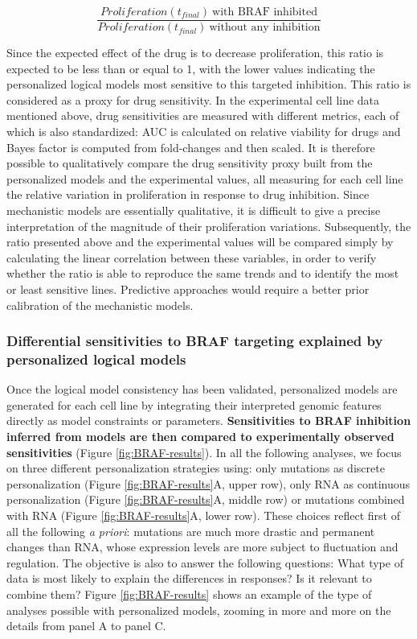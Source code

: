 \documentclass[a4paper,12pt,twoside,onecolumn,openright,final,oldfontcommands]{memoir}
\begin{document}
\[\dfrac{Proliferation(t_{final})~\text{with BRAF inhibited}}{Proliferation(t_{final})~\text{without any inhibition}}\]

Since the expected effect of the drug is to decrease proliferation, this
ratio is expected to be less than or equal to 1, with the lower values
indicating the personalized logical models most sensitive to this
targeted inhibition. This ratio is considered as a proxy for drug
sensitivity. In the experimental cell line data mentioned above, drug
sensitivities are measured with different metrics, each of which is also
standardized: AUC is calculated on relative viability for drugs and
Bayes factor is computed from fold-changes and then scaled. It is
therefore possible to qualitatively compare the drug sensitivity proxy
built from the personalized models and the experimental values, all
measuring for each cell line the relative variation in proliferation in
response to drug inhibition. Since mechanistic models are essentially
qualitative, it is difficult to give a precise interpretation of the
magnitude of their proliferation variations. Subsequently, the ratio
presented above and the experimental values will be compared simply by
calculating the linear correlation between these variables, in order to
verify whether the ratio is able to reproduce the same trends and to
identify the most or least sensitive lines. Predictive approaches would
require a better prior calibration of the mechanistic models.

\subsubsection{Differential sensitivities to BRAF targeting explained by
personalized logical models}\label{diff-BRAF}

Once the logical model consistency has been validated, personalized
models are generated for each cell line by integrating their interpreted
genomic features directly as model constraints or parameters.
\textbf{Sensitivities to BRAF inhibition inferred from models are then
compared to experimentally observed sensitivities} (Figure
\ref{fig:BRAF-results}). In all the following analyses, we focus on
three different personalization strategies using: only mutations as
discrete personalization (Figure \ref{fig:BRAF-results}A, upper row),
only RNA as continuous personalization (Figure \ref{fig:BRAF-results}A,
middle row) or mutations combined with RNA (Figure
\ref{fig:BRAF-results}A, lower row). These choices reflect first of all
the following \emph{a priori}: mutations are much more drastic and
permanent changes than RNA, whose expression levels are more subject to
fluctuation and regulation. The objective is also to answer the
following questions: What type of data is most likely to explain the
differences in responses? Is it relevant to combine them? Figure
\ref{fig:BRAF-results} shows an example of the type of analyses possible
with personalized models, zooming in more and more on the details from
panel A to panel C.
\end{document}
